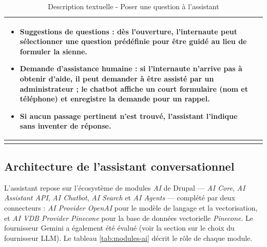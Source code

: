 \begin{longtable}{|p{4cm}|p{12cm}|}
\begin{itemize}
\item \textbf{Suggestions de questions} : dès l'ouverture, l'internaute peut sélectionner une question prédéfinie pour être guidé au lieu de formuler la sienne.

\item \textbf{Demande d'assistance humaine} : si l'internaute n'arrive pas à obtenir d'aide, il peut demander à être assisté par un administrateur ; le chatbot affiche un court formulaire (nom et téléphone) et enregistre la demande pour un rappel.

\item Si aucun passage pertinent n'est trouvé, l'assistant l'indique sans inventer de réponse.
\end{itemize}
\\ \hline

\caption{Description textuelle - Poser une question à l'assistant}
\label{tab:desc-poser-question}

\end{longtable}

\subsection{Architecture de l'assistant conversationnel}
L'assistant repose sur l'écosystème de modules \textit{AI} de Drupal — \textit{AI Core}, \textit{AI Assistant API}, \textit{AI Chatbot}, \textit{AI Search} et \textit{AI Agents} — complété par deux connecteurs : \textit{AI Provider OpenAI} pour le modèle de langage et la vectorisation, et \textit{AI VDB Provider Pinecone} pour la base de données vectorielle \textit{Pinecone}. Le fournisseur Gemini a également été évalué (voir la section sur le choix du fournisseur LLM). Le tableau \ref{tab:modules-ai} décrit le rôle de chaque module.

\renewcommand{\arraystretch}{1.3}


